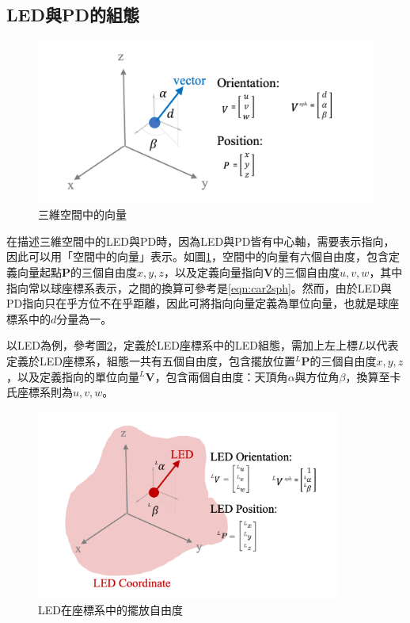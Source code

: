         \subsection{LED與PD的組態}
        \label{chp:config}


        \begin{figure}[ht]
            \centering
            \includegraphics[width=12cm]{ch2pic/vec_config.png}
            \caption{三維空間中的向量}
            \label{pic:vec_config}
        \end{figure}

        
        在描述三維空間中的LED與PD時，因為LED與PD皆有中心軸，需要表示指向，因此可以用「空間中的向量」表示。如圖\ref{pic:vec_config}，空間中的向量有六個自由度，包含定義向量起點$\boldsymbol{P}$的三個自由度$x,y,z$，以及定義向量指向$\boldsymbol{V}$的三個自由度$u,v,w$，其中指向常以球座標系表示，之間的換算可參考是\ref{eqn:car2sph}。然而，由於LED與PD指向只在乎方位不在乎距離，因此可將指向向量定義為單位向量，也就是球座標系中的$d$分量為一。
        
        以LED為例，參考圖\ref{pic:led_config}，定義於LED座標系中的LED組態，需加上左上標$L$以代表定義於LED座標系，組態一共有五個自由度，包含擺放位置$^L \boldsymbol{P}$的三個自由度$x,y,z$，以及定義指向的單位向量$^L\boldsymbol{V}$，包含兩個自由度：天頂角$\alpha$與方位角$\beta$，換算至卡氏座標系則為$u,v,w$。

        \begin{figure}[ht]
            \centering
            \includegraphics[width=10cm]{ch2pic/LED_config.png}
            \caption{LED在座標系中的擺放自由度}
            \label{pic:led_config}
        \end{figure}

